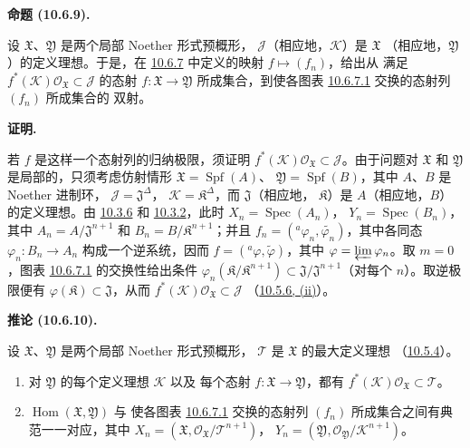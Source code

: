 \documentclass[UTF8,fontset=none,11pt,oneside,openany]{ctexbook}
\newenvironment{proposition}[1][]{%
  \par\medskip\noindent\textbf{命题 (#1).}\ %
}{\par}
\newenvironment{corollary}[1][]{%
  \par\medskip\noindent\textbf{推论 (#1).}\ %
}{\par}
\newenvironment{proof}{%
  \par\medskip\noindent\textbf{证明.}\ %
}{\par}
\let\EGAOriginalLabel\label
\renewcommand{\label}[1]{\phantomsection\EGAOriginalLabel{#1}}
\begin{document}
\begin{proposition}[10.6.9]
\label{I.10.6.9-fr}
设 $\mathfrak{X}$、$\mathfrak{Y}$ 是两个局部 Noether 形式预概形，
$\mathscr{J}$（相应地，$\mathscr{K}$）是 $\mathfrak{X}$
（相应地，$\mathfrak{Y}$）的定义理想。于是，在
\hyperref[I.10.6.7-fr]{10.6.7} 中定义的映射 $f\mapsto(f_n)$，给出从
满足 $f^*(\mathscr{K})\mathscr{O}_{\mathfrak{X}}\subset\mathscr{J}$ 的态射
$f:\mathfrak{X}\to\mathfrak{Y}$ 所成集合，到使各图表
\hyperref[I.10.6.7.1-fr]{10.6.7.1} 交换的态射列 $(f_n)$ 所成集合的
双射。
\end{proposition}

\begin{proof}
若 $f$ 是这样一个态射列的归纳极限，须证明
$f^*(\mathscr{K})\mathscr{O}_{\mathfrak{X}}\subset\mathscr{J}$。由于问题对
$\mathfrak{X}$ 和 $\mathfrak{Y}$ 是局部的，只须考虑仿射情形
$\mathfrak{X}=\operatorname{Spf}(A)$、
$\mathfrak{Y}=\operatorname{Spf}(B)$，其中 $A$、$B$ 是 Noether 进制环，
$\mathscr{J}=\mathfrak{J}^\Delta$，
$\mathscr{K}=\mathfrak{K}^\Delta$，而 $\mathfrak{J}$（相应地，
$\mathfrak{K}$）是 $A$（相应地，$B$）的定义理想。由
\hyperref[I.10.3.6-fr]{10.3.6} 和
\hyperref[I.10.3.2-fr]{10.3.2}，此时
$X_n=\operatorname{Spec}(A_n)$，
$Y_n=\operatorname{Spec}(B_n)$，其中
$A_n=A/\mathfrak{J}^{n+1}$ 和 $B_n=B/\mathfrak{K}^{n+1}$；并且
$f_n=({}^a\varphi_n,\widetilde{\varphi_n})$，其中各同态
$\varphi_n:B_n\to A_n$ 构成一个逆系统，因而
$f=({}^a\varphi,\widetilde{\varphi})$，其中
$\varphi=\varprojlim\varphi_n$。取 $m=0$，图表
\hyperref[I.10.6.7.1-fr]{10.6.7.1} 的交换性给出条件
$\varphi_n(\mathfrak{K}/\mathfrak{K}^{n+1})
\subset\mathfrak{J}/\mathfrak{J}^{n+1}$（对每个 $n$）。取逆极限便有
$\varphi(\mathfrak{K})\subset
\mathfrak{J}$，从而
$f^*(\mathscr{K})\mathscr{O}_{\mathfrak{X}}\subset\mathscr{J}$
（\hyperref[I.10.5.6-fr]{10.5.6, (ii)}）。
\end{proof}

\begin{corollary}[10.6.10]
\label{I.10.6.10-fr}
设 $\mathfrak{X}$、$\mathfrak{Y}$ 是两个局部 Noether 形式预概形，
$\mathscr{T}$ 是 $\mathfrak{X}$ 的最大定义理想
（\hyperref[I.10.5.4-fr]{10.5.4}）。
\begin{enumerate}
  \item[\rm{(i)}] 对 $\mathfrak{Y}$ 的每个定义理想 $\mathscr{K}$ 以及
  每个态射 $f:\mathfrak{X}\to\mathfrak{Y}$，都有
  $f^*(\mathscr{K})\mathscr{O}_{\mathfrak{X}}\subset\mathscr{T}$。
  \item[\rm{(ii)}] $\operatorname{Hom}(\mathfrak{X},\mathfrak{Y})$ 与
  使各图表 \hyperref[I.10.6.7.1-fr]{10.6.7.1} 交换的态射列
  $(f_n)$ 所成集合之间有典范一一对应，其中
  $X_n=(\mathfrak{X},
  \mathscr{O}_{\mathfrak{X}}/\mathscr{T}^{n+1})$，
  $Y_n=(\mathfrak{Y},
  \mathscr{O}_{\mathfrak{Y}}/\mathscr{K}^{n+1})$。
\end{enumerate}
\end{corollary}
\end{document}
